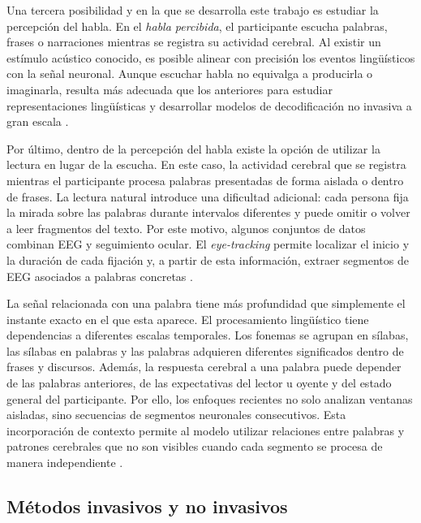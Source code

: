 Una tercera posibilidad y en la que se desarrolla este trabajo es estudiar la percepción del habla. En el \textit{habla percibida}, el participante escucha palabras, frases o narraciones mientras se registra su actividad cerebral. Al existir un estímulo acústico conocido, es posible alinear con precisión los eventos lingüísticos con la señal neuronal. Aunque escuchar habla no equivalga a producirla o imaginarla, resulta más adecuada que los anteriores para estudiar representaciones lingüísticas y desarrollar modelos de decodificación no invasiva a gran escala \cite{ozdogan2025libribrain}.

Por último, dentro de la percepción del habla existe la opción de utilizar la lectura en lugar de la escucha. En este caso, la actividad cerebral que se registra mientras el participante procesa palabras presentadas de forma aislada o dentro de frases. La lectura natural introduce una dificultad adicional: cada persona fija la mirada sobre las palabras durante intervalos diferentes y puede omitir o volver a leer fragmentos del texto. Por este motivo, algunos conjuntos de datos combinan EEG y seguimiento ocular. El \textit{eye-tracking} permite localizar el inicio y la duración de cada fijación y, a partir de esta información, extraer segmentos de EEG asociados a palabras concretas \cite{dimigen2011coregistration,hollenstein2020zuco2}.

La señal relacionada con una palabra tiene más profundidad que simplemente el instante exacto en el que esta aparece. El procesamiento lingüístico tiene dependencias a diferentes escalas temporales. Los fonemas se agrupan en sílabas, las sílabas en palabras y las palabras adquieren diferentes significados dentro de frases y discursos. Además, la respuesta cerebral a una palabra puede depender de las palabras anteriores, de las expectativas del lector u oyente y del estado general del participante. Por ello, los enfoques recientes no solo analizan ventanas aisladas, sino secuencias de segmentos neuronales consecutivos. Esta incorporación de contexto permite al modelo utilizar relaciones entre palabras y patrones cerebrales que no son visibles cuando cada segmento se procesa de manera independiente \cite{dascoli2025words,jayalath2026megxl}.




\subsection{Métodos invasivos y no invasivos}

